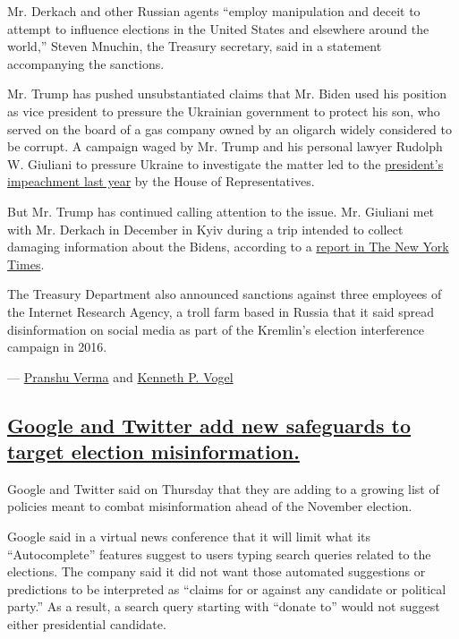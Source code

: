 Mr. Derkach and other Russian agents ``employ manipulation and deceit to
attempt to influence elections in the United States and elsewhere around
the world,'' Steven Mnuchin, the Treasury secretary, said in a statement
accompanying the sanctions.

Mr. Trump has pushed unsubstantiated claims that Mr. Biden used his
position as vice president to pressure the Ukrainian government to
protect his son, who served on the board of a gas company owned by an
oligarch widely considered to be corrupt. A campaign waged by Mr. Trump
and his personal lawyer Rudolph W. Giuliani to pressure Ukraine to
investigate the matter led to the
\href{https://www.nytimes3xbfgragh.onion/2019/12/18/us/politics/trump-impeached.html}{president's
impeachment last year} by the House of Representatives.

But Mr. Trump has continued calling attention to the issue. Mr. Giuliani
met with Mr. Derkach in December in Kyiv during a trip intended to
collect damaging information about the Bidens, according to a
\href{https://www.nytimes3xbfgragh.onion/2019/12/04/us/politics/giuliani-europe-impeachment.html}{report
in The New York Times}.

The Treasury Department also announced sanctions against three employees
of the Internet Research Agency, a troll farm based in Russia that it
said spread disinformation on social media as part of the Kremlin's
election interference campaign in 2016.

--- \href{https://www.nytimes3xbfgragh.onion/by/pranshu-verma}{Pranshu
Verma} and
\href{https://www.nytimes3xbfgragh.onion/by/kenneth-p-vogel}{Kenneth P.
Vogel}

\hypertarget{google-and-twitter-add-new-safeguards-to-target-election-misinformation}{%
\subsection{\texorpdfstring{\protect\hyperlink{google-and-twitter-add-new-safeguards-to-target-election-misinformation}{Google
and Twitter add new safeguards to target election
misinformation.}}{Google and Twitter add new safeguards to target election misinformation.}}\label{google-and-twitter-add-new-safeguards-to-target-election-misinformation}}

Google and Twitter said on Thursday that they are adding to a growing
list of policies meant to combat misinformation ahead of the November
election.

Google said in a virtual news conference that it will limit what its
``Autocomplete'' features suggest to users typing search queries related
to the elections. The company said it did not want those automated
suggestions or predictions to be interpreted as ``claims for or against
any candidate or political party.'' As a result, a search query starting
with ``donate to'' would not suggest either presidential candidate.


